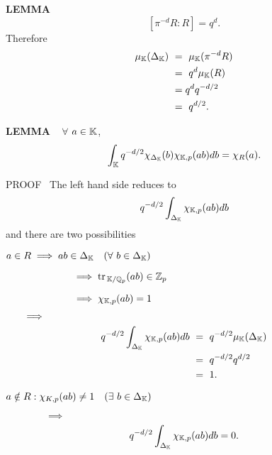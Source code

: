 \vspace{0.1cm}

\begin{x}{\small\bf LEMMA} \ %
\[
[\pi^{-d}R:R] = q^d.
\]
Therefore
\begin{align*}
\mu_\K(\Delta_\K) \ 
&=\  \mu_\K(\pi^{-d}R)\\	
&=\  q^d\mu_\K(R)\\
&= q^d q^{-d/2}\\								
&=\  q^{d/2}.
\end{align*}
\end{x}

\vspace{0.1cm}

\begin{x}{\small\bf LEMMA} \ %
$\forall$ $a \in \mathbb{K}$,
\[
\int_{\mathbb{K}} q^{-d/2} \chi_{\Delta_{\mathbb{K}}} (b) \chi_{\mathbb{K},p} (ab) db = \chi_R(a).
\]

\vspace{0.1cm}

PROOF \  The left hand side reduces to
\[
q^{-d/2} \int_{\Delta_{\mathbb{K}}} \chi_{\mathbb{K},p} (ab) db
\]
and there are two possibilities

\indent\indent\textbullet \quad 
$a \in R  \implies ab \in \Delta_{\mathbb{K}} \quad (\forall \ b \in \Delta_{\mathbb{K}})$

$\hspace{2.4cm}\implies \text{tr}\hspace{0.05cm}_{\mathbb{K}/ \mathbb{Q}_p}(ab) \in \mathbb{Z}_p$

$\hspace{2.4cm}\implies \chi_{\mathbb{K},p}(ab) = 1$

$\indent\implies$
\begin{align*}
q^{-d/2} \int_{\Delta_\K} \chi_{\K,p}(ab)db \ 
&=\  q^{-d/2} \mu_\K(\Delta_\K) \\
&=\  q^{-d/2} q^{d/2}  \\
&=\  1.
\end{align*}


\indent\indent\textbullet \quad 
$a \notin R: \chi_{K,p}(ab) \ne 1 \quad (\exists \  b \in \Delta_{\mathbb{K}})$

$\qquad\qquad\implies$
\[
q^{-d/2} \int_{\Delta_{\mathbb{K}}} \chi_{\mathbb{K},p}(ab)db = 0.
\]



\end{x}
